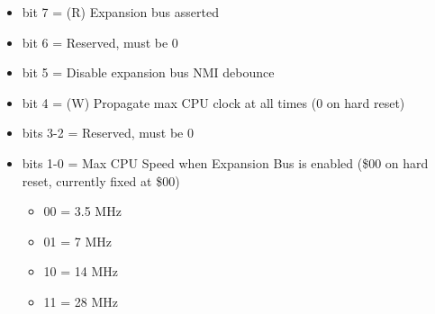\begin{itemize}
\item bit 7 = (R) Expansion bus  asserted
\item bit 6 = Reserved, must be 0
\item bit 5 = Disable expansion bus NMI debounce
\item bit 4 = (W) Propagate max CPU clock at all times (0 on hard
  reset)
\item bits 3-2 = Reserved, must be 0
\item bits 1-0 = Max CPU Speed when Expansion Bus is enabled (\$00 on
  hard reset, currently fixed at \$00)
  \begin{itemize}
  \item 00 = 3.5 MHz
  \item 01 = 7 MHz
  \item 10 = 14 MHz
  \item 11 = 28 MHz
  \end{itemize}
\end{itemize}


